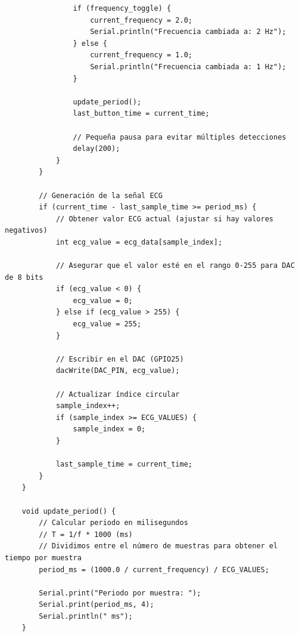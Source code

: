 \documentclass[a4paper,openany,12pt]{book}
\begin{document}
\begin{verbatim}
				if (frequency_toggle) {
					current_frequency = 2.0;
					Serial.println("Frecuencia cambiada a: 2 Hz");
				} else {
					current_frequency = 1.0;
					Serial.println("Frecuencia cambiada a: 1 Hz");
				}
				
				update_period();
				last_button_time = current_time;
				
				// Pequeña pausa para evitar múltiples detecciones
				delay(200);
			}
		}
		
		// Generación de la señal ECG
		if (current_time - last_sample_time >= period_ms) {
			// Obtener valor ECG actual (ajustar si hay valores negativos)
			int ecg_value = ecg_data[sample_index];
			
			// Asegurar que el valor esté en el rango 0-255 para DAC de 8 bits
			if (ecg_value < 0) {
				ecg_value = 0;
			} else if (ecg_value > 255) {
				ecg_value = 255;
			}
			
			// Escribir en el DAC (GPIO25)
			dacWrite(DAC_PIN, ecg_value);
			
			// Actualizar índice circular
			sample_index++;
			if (sample_index >= ECG_VALUES) {
				sample_index = 0;
			}
			
			last_sample_time = current_time;
		}
	}
	
	void update_period() {
		// Calcular periodo en milisegundos
		// T = 1/f * 1000 (ms)
		// Dividimos entre el número de muestras para obtener el tiempo por muestra
		period_ms = (1000.0 / current_frequency) / ECG_VALUES;
		
		Serial.print("Periodo por muestra: ");
		Serial.print(period_ms, 4);
		Serial.println(" ms");
	}
	
\end{verbatim}





\end{document}
